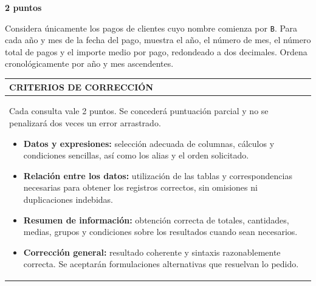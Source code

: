 \documentclass[11pt,a4paper]{article}
\begin{document}
\par\medskip{}\hfill{\color{LBcereza}\bfseries 2 puntos}\par\smallskip
Considera únicamente los pagos de clientes cuyo nombre comienza por \texttt{B}. Para cada año y mes de la fecha del pago, muestra el año, el número de mes, el número total de pagos y el importe medio por pago, redondeado a dos decimales. Ordena cronológicamente por año y mes ascendentes.\par\medskip
\medskip\noindent\begin{tabularx}{\textwidth}{|X|}\hline
\cellcolor{LBgris}\color{LBcian}\bfseries CRITERIOS DE CORRECCIÓN \\ \hline
\begin{minipage}{\dimexpr\linewidth-2\tabcolsep\relax}\vspace{2mm}\small Cada consulta vale 2 puntos. Se concederá puntuación parcial y no se penalizará dos veces un error arrastrado.\par\smallskip \begin{itemize}[leftmargin=4mm,nosep]\item \textbf{Datos y expresiones:} selección adecuada de columnas, cálculos y condiciones sencillas, así como los alias y el orden solicitado.
\item \textbf{Relación entre los datos:} utilización de las tablas y correspondencias necesarias para obtener los registros correctos, sin omisiones ni duplicaciones indebidas.
\item \textbf{Resumen de información:} obtención correcta de totales, cantidades, medias, grupos y condiciones sobre los resultados cuando sean necesarios.
\item \textbf{Corrección general:} resultado coherente y sintaxis razonablemente correcta. Se aceptarán formulaciones alternativas que resuelvan lo pedido.
\end{itemize}\vspace{2mm}\end{minipage} \\ \hline
\end{tabularx}\medskip
\end{document}
